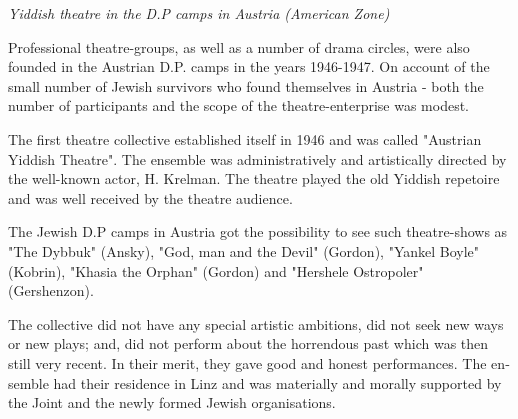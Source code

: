 \documentclass{article}
\begin{document}
\begin{pairs}
\begin{Leftside}
\begin{english}
\beginnumbering
\autopar
\emph{
Yiddish theatre in the D.P camps in Austria (American Zone)
}
\newline 
 
Professional theatre-groups, as well as a number of drama circles, were also founded in the Austrian D.P. camps in the years 1946-1947.
On account of the small number of Jewish survivors who found themselves in Austria - both the number of participants and the scope of
the theatre-enterprise was modest.

The first theatre collective established itself in 1946 and was called "Austrian Yiddish Theatre". The ensemble was administratively and 
artistically directed by the well-known actor, H. Krelman. 
The theatre played the old Yiddish repetoire and
was well received by the theatre audience.

The Jewish D.P camps in Austria got the possibility to see such theatre-shows as "The Dybbuk" (Ansky),
"God, man and the Devil" (Gordon), "Yankel Boyle" (Kobrin), "Khasia the Orphan" (Gordon) and "Hershele Ostropoler" (Gershenzon).

The collective did not have any special artistic ambitions, did not seek new ways or new plays; and, did not perform about the horrendous past which was then still
very recent. In their merit, they gave good and honest performances. The ensemble had their residence in Linz and was materially and morally
supported by the Joint and the newly formed Jewish organisations.

\endnumbering
\end{english}
\end{Leftside}

\end{pairs}
\Columns
\end{document}
